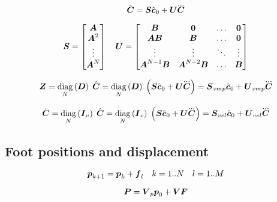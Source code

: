 \begin{equation*}
\cState = \M{S} \cstate_0     +   \M{U} \cJerk
\end{equation*}

\begin{equation*}
    \mbox{\boldmath $S$} =
        \begin{bmatrix}
        \mbox{\boldmath $A$} \\
        \mbox{\boldmath $A$}^2 \\
        \vdots \\
        \mbox{\boldmath $A$}^{N}\\
        \end{bmatrix}
    \quad
    \mbox{\boldmath $U$} =
        \begin{bmatrix}
        \mbox{\boldmath $B$}               & \mbox{\boldmath $0$}             & \dots & \mbox{\boldmath $0$} \\
        \mbox{\boldmath $A$}\mbox{\boldmath $B$}          & \mbox{\boldmath $B$}             & \dots & \mbox{\boldmath $0$} \\
        \vdots              & \vdots            & \ddots& \vdots \\
        \mbox{\boldmath $A$}^{N-1}\mbox{\boldmath $B$}    & \mbox{\boldmath $A$}^{N-2}\mbox{\boldmath $B$}  & \dots & \mbox{\boldmath $B$} \\
        \end{bmatrix}
\end{equation*}

\begin{equation*}
    \ZMP = 
        \diag{N}{\M{D}} \cState = 
        \diag{N}{\M{D}} \left(\M{S} \cstate_0  +  \M{U} \cJerk \right) = 
        \M{S}_{zmp} \cstate_0 + \M{U}_{zmp} \cJerk
\end{equation*}

\begin{equation*}
    \cVel = 
        \diag{N}{\M{I}_{v}} \cState = 
        \diag{N}{\M{I}_{v}} \left(\M{S} \cstate_0  +  \M{U} \cJerk \right) = 
        \M{S}_{vel} \cstate_0 + \M{U}_{vel} \cJerk
\end{equation*}


\subsection{Foot positions and displacement}
\begin{equation*}
    \mbox{\boldmath $p$}_{k+1} = \mbox{\boldmath $p$}_k + \mbox{\boldmath $f$}_{l}
    \quad
    k = 1..N
    \quad
    l = 1..M
\end{equation*}

\begin{equation*}
    \mbox{\boldmath $P$} = \mbox{\boldmath $V$}_p \mbox{\boldmath $p$}_0 + \mbox{\boldmath $V$} \mbox{\boldmath $F$}
\end{equation*}

